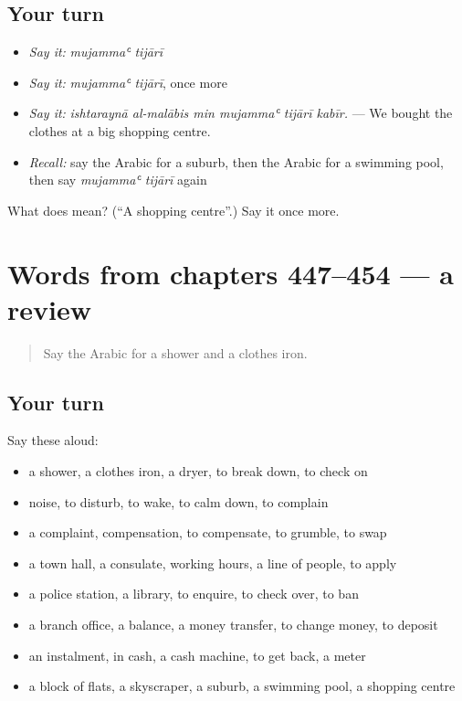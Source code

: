 \subsection*{Your turn}
\begin{itemize}
\raggedright
  \item \emph{Say it:} \emph{mujammaʿ tijārī}
  \item \emph{Say it:} \emph{mujammaʿ tijārī}, once more
  \item \emph{Say it:} \emph{ishtaraynā al-malābis min mujammaʿ tijārī kabīr.} — We bought the clothes at a big shopping centre.
  \item \emph{Recall:} say the Arabic for a suburb, then the Arabic for a swimming pool, then say \emph{mujammaʿ tijārī} again
\end{itemize}

\begin{tcolorbox}[breakable,colback=teal!4,colframe=teal!35!black,title={Before you move on}]
What does   mean? (\textquotedblleft{}A shopping centre\textquotedblright{}.) Say it once more.
\end{tcolorbox}
\section[(dialogue)]{Words from chapters 447–454 — a review}

\label{lesson:AR-R454-review-447-454}



\begin{quote}
Say the Arabic for a shower and a clothes iron.
\end{quote}

\subsection*{Your turn}
Say these aloud:

\begin{itemize}
\raggedright
  \item a shower, a clothes iron, a dryer, to break down, to check on
  \item noise, to disturb, to wake, to calm down, to complain
  \item a complaint, compensation, to compensate, to grumble, to swap
  \item a town hall, a consulate, working hours, a line of people, to apply
  \item a police station, a library, to enquire, to check over, to ban
  \item a branch office, a balance, a money transfer, to change money, to deposit
  \item an instalment, in cash, a cash machine, to get back, a meter
  \item a block of flats, a skyscraper, a suburb, a swimming pool, a shopping centre
\end{itemize}

